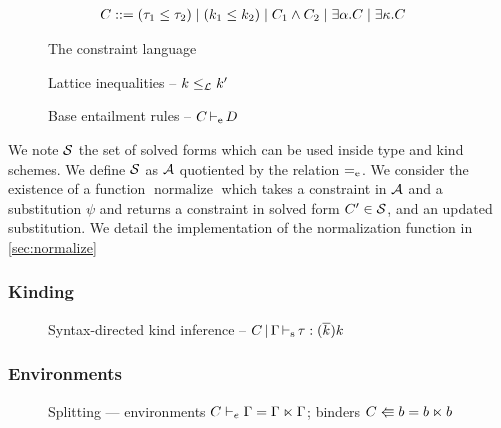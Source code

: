 \begin{figure}[tp]
  \centering
  \begin{align*}
    C &::= (\tau_1 \leq \tau_2)
        \mid (k_1 \leq k_2)
        \mid C_1 \wedge C_2
        \mid \exists \alpha.C
        \mid \exists \kappa.C
  \end{align*}
  \caption{The constraint language}
  \label{grammar:constraint}
\end{figure}

\begin{figure*}[tp]
  
  \caption{Lattice inequalities -- $k \leq_\mathcal L k'$}
  
  \caption{Base entailment rules -- $C \operatorname{\vdash_e} D$ }
  \label{rules:entail}
\end{figure*}


We note $\mathcal S$ the set of solved forms
which can be used inside type and kind schemes.
We define $\mathcal S$ as $\mathcal A$ quotiented by the relation $\operatorname{=_e}$.
%
We consider the existence of a function $\operatorname{normalize}$ which takes
a constraint in $\mathcal A$ and a substitution $\psi$ and returns a constraint
in solved form $C' \in \mathcal S$,
and an updated substitution. We detail the implementation
of the normalization function in \cref{sec:normalize}


\subsubsection{Kinding}


\begin{figure}[ht]
  \centering
  
  \caption{Syntax-directed kind inference --
    $C \operatorname{|} \Gamma \operatorname{\vdash_s} \tau : (\overline{k_{{}}})k$}
  \label{rules:sd-kinding}
\end{figure}

\subsubsection{Environments}


\begin{figure}[tp]
  
  \caption{Splitting --- environments $C \vdash_e \Gamma = \Gamma \ltimes \Gamma$; binders $C \Lleftarrow b = b \ltimes b$}
  \label{fig:sd-splitting}
\end{figure}

